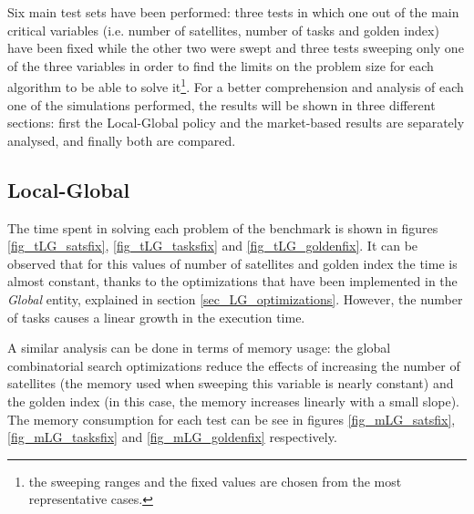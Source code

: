 Six main test sets have been performed: three tests in which one out of the main critical variables (i.e. number of satellites, number of tasks and golden index) have been fixed while the other two were swept and three tests sweeping only one of the three variables in order to find the limits on the problem size for each algorithm to be able to solve it\footnote{the sweeping ranges and the fixed values are chosen from the most representative cases.}. For a better comprehension and analysis of each one of the simulations performed, the results will be shown in three different sections: first the Local-Global policy and the market-based results are separately analysed, and finally both are compared.

\subsection{Local-Global}

The time spent in solving each problem of the benchmark is shown in figures \ref{fig_tLG_satsfix}, \ref{fig_tLG_tasksfix} and \ref{fig_tLG_goldenfix}. It can be observed that for this values of number of satellites and golden index the time is almost constant, thanks to the optimizations that have been implemented in the \emph{Global} entity, explained in section \ref{sec_LG_optimizations}. However, the number of tasks causes a linear growth in the execution time.

A similar analysis can be done in terms of memory usage: the global combinatorial search optimizations reduce the effects of increasing the number of satellites (the memory used when sweeping this variable is nearly constant) and the golden index (in this case, the memory increases linearly with a small slope). The memory consumption for each test can be see in figures \ref{fig_mLG_satsfix}, \ref{fig_mLG_tasksfix} and \ref{fig_mLG_goldenfix} respectively.


